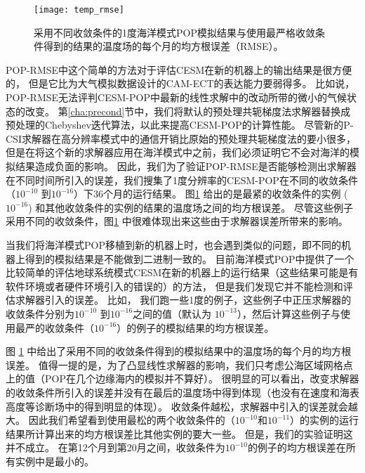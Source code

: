 \begin{figure}%
\begin{center}
\texttt{[image: temp\_rmse]}
\end{center}
\caption[] {采用不同收敛条件的1度海洋模式POP模拟结果与使用最严格收敛条件得到的结果的温度场的每个月的均方根误差（RMSE）。}
\label{fig:ssh_rmse_t}
\end{figure}

POP-RMSE中这个简单的方法对于评估CESM在新的机器上的输出结果是很方便的， 但是它比为大气模拟数据设计的CAM-ECT的表达能力要弱得多。 
比如说，POP-RMSE无法评判CESM-POP中最新的线性求解中的改动所带的微小的气候状态的改变\cite{yong2015}。 
第\ref{cha:precond}节中，我们将默认的预处理共轭梯度法求解器替换成预处理的Chebyshev迭代算法，以此来提高CESM-POP的计算性能。
尽管新的P-CSI求解器在高分辨率模式中的通信开销比原始的预处理共轭梯度法的要小很多，但是在将这个新的求解器应用在海洋模式中之前，我们必须证明它不会对海洋的模拟结果造成负面的影响。 
因此，我们为了验证POP-RMSE是否能够检测出求解器在不同时间所引入的误差，我们搜集了1度分辨率的CESM-POP在不同的收敛条件（$10^{-10}$ 到$10^{-16}$）下36个月的运行结果。
图\ref{fig:ssh_rmse_t} 给出的是最紧的收敛条件的实例 ($10^{-16}$) 和其他收敛条件的实例的结果的温度场之间的均方根误差。 
尽管这些例子采用不同的收敛条件，图\ref{fig:ssh_rmse_t} 中很难体现出来这些由于求解器误差所带来的影响\cite{yong2015}。 



当我们将海洋模式POP移植到新的机器上时，也会遇到类似的问题，即不同的机器上得到的模拟结果是不能做到二进制一致的。 
目前海洋模式POP中提供了一个比较简单的评估地球系统模式CESM在新的机器上的运行结果（这些结果可能是有软件环境或者硬件环境引入的错误的）的方法， 但是我们发现它并不能检测和评估求解器引入的误差。 
比如， 我们跑一些1度的例子，这些例子中正压求解器的收敛条件分别为$10^{-10}$ 到$10^{-16}$之间的值（默认为 $10^{-13}$），然后计算这些例子与使用最严的收敛条件（$10^{-16}$）的例子的模拟结果的均方根误差。 

图 \ref{fig:ssh_rmse_t} 中给出了采用不同的收敛条件得到的模拟结果中的温度场的每个月的均方根误差。 
值得一提的是，为了凸显线性求解器的影响，我们只考虑公海区域网格点上的值（POP在几个边缘海内的模拟并不算好）。 
很明显的可以看出，改变求解器的收敛条件所引入的误差并没有在最后的温度场中得到体现（也没有在速度和海表高度等诊断场中的得到明显的体现）。 
收敛条件越松，求解器中引入的误差就会越大。
因此我们希望看到使用最松的两个收敛条件的（$10^{-10}$和$10^{-11}$）的实例的运行结果所计算出来的均方根误差比其他实例的要大一些。 
但是，我们的实验证明这并不成立。 
在第12个月到第20月之间，收敛条件为$10^{-10}$的例子的均方根误差在所有实例中是最小的。 

